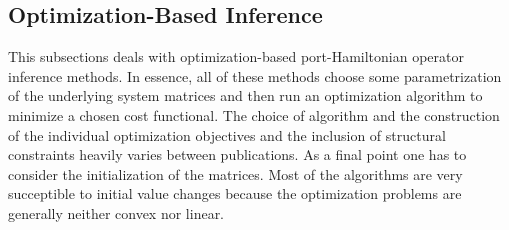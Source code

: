 
\subsection{Optimization-Based Inference}\label{subsec:optimization-based-inference}

This subsections deals with optimization-based port-Hamiltonian operator inference methods.
In essence, all of these methods choose some parametrization of the underlying system matrices and then run an optimization algorithm to minimize a chosen cost functional.
The choice of algorithm and the construction of the individual optimization objectives and the inclusion of structural constraints heavily varies between publications.
As a final point one has to consider the initialization of the matrices.
Most of the algorithms are very succeptible to initial value changes because the optimization problems are generally neither convex nor linear.

